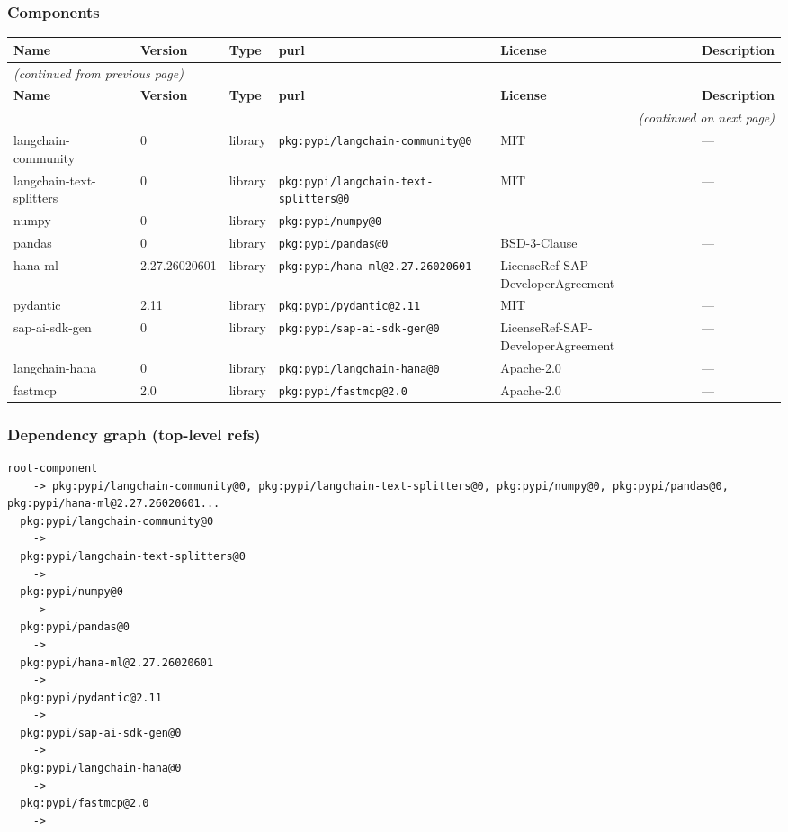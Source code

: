 \documentclass[11pt,a4paper]{article}
\begin{document}
\subsubsection*{Components}
\begin{longtable}{|p{4cm}|p{2cm}|p{1.6cm}|p{5cm}|p{1.5cm}|p{3.5cm}|}
\toprule
\rowcolor{sbomhdr}\textbf{Name} & \textbf{Version} & \textbf{Type} & \textbf{purl} & \textbf{License} & \textbf{Description} \\
\midrule
\endfirsthead
\multicolumn{6}{l}{\small\itshape (continued from previous page)} \\
\toprule
\rowcolor{sbomhdr}\textbf{Name} & \textbf{Version} & \textbf{Type} & \textbf{purl} & \textbf{License} & \textbf{Description} \\
\midrule
\endhead
\midrule
\multicolumn{6}{r}{\small\itshape (continued on next page)} \\
\endfoot
\bottomrule
\endlastfoot
\raggedright langchain-community & 0 & library & \small\texttt{pkg:pypi/langchain-community@0} & MIT & \small — \\
\raggedright langchain-text-splitters & 0 & library & \small\texttt{pkg:pypi/langchain-text-splitters@0} & MIT & \small — \\
\raggedright numpy & 0 & library & \small\texttt{pkg:pypi/numpy@0} & — & \small — \\
\raggedright pandas & 0 & library & \small\texttt{pkg:pypi/pandas@0} & BSD-3-Clause & \small — \\
\raggedright hana-ml & 2.27.26020601 & library & \small\texttt{pkg:pypi/hana-ml@2.27.26020601} & LicenseRef-SAP-DeveloperAgreement & \small — \\
\raggedright pydantic & 2.11 & library & \small\texttt{pkg:pypi/pydantic@2.11} & MIT & \small — \\
\raggedright sap-ai-sdk-gen & 0 & library & \small\texttt{pkg:pypi/sap-ai-sdk-gen@0} & LicenseRef-SAP-DeveloperAgreement & \small — \\
\raggedright langchain-hana & 0 & library & \small\texttt{pkg:pypi/langchain-hana@0} & Apache-2.0 & \small — \\
\raggedright fastmcp & 2.0 & library & \small\texttt{pkg:pypi/fastmcp@2.0} & Apache-2.0 & \small — \\
\end{longtable}

\subsubsection*{Dependency graph (top-level refs)}
\begin{lstlisting}[style=depgraph]
  root-component
    -> pkg:pypi/langchain-community@0, pkg:pypi/langchain-text-splitters@0, pkg:pypi/numpy@0, pkg:pypi/pandas@0, pkg:pypi/hana-ml@2.27.26020601...
  pkg:pypi/langchain-community@0
    -> 
  pkg:pypi/langchain-text-splitters@0
    -> 
  pkg:pypi/numpy@0
    -> 
  pkg:pypi/pandas@0
    -> 
  pkg:pypi/hana-ml@2.27.26020601
    -> 
  pkg:pypi/pydantic@2.11
    -> 
  pkg:pypi/sap-ai-sdk-gen@0
    -> 
  pkg:pypi/langchain-hana@0
    -> 
  pkg:pypi/fastmcp@2.0
    -> 
\end{lstlisting}
\end{document}
